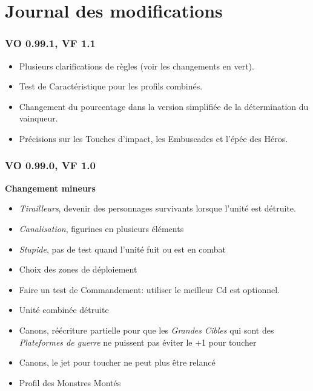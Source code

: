 
\part{Journal des modifications}

\section*{VO 0.99.1, VF 1.1}
\begin{itemize}
\item Plusieurs clarifications de règles (voir les changements en vert). 
\item Test de Caractéristique pour les profils combinés.
\item Changement du pourcentage dans la version simplifiée de la détermination du vainqueur.
\item Précisions sur les Touches d'impact, les Embuscades et l'épée des Héros.
\end{itemize}


\section*{VO 0.99.0, VF 1.0}
\noindent \textbf{Changement mineurs}
\begin{itemize}
\item \emph{Tirailleurs}, devenir des personnages survivants lorsque l'unité est détruite.
\item \emph{Canalisation}, figurines en plusieurs éléments
\item \emph{Stupide}, pas de test quand l'unité fuit ou est en combat
\item Choix des zones de déploiement
\item Faire un test de Commandement: utiliser le meilleur Cd est optionnel.
\item Unité combinée détruite
\item Canons, réécriture partielle pour que les \emph{Grandes Cibles} qui sont des \emph{Plateformes de guerre} ne puissent pas éviter le +1 pour toucher
\item Canons, le jet pour toucher ne peut plus être relancé
\item Profil des Monstres Montés
\end{itemize}

